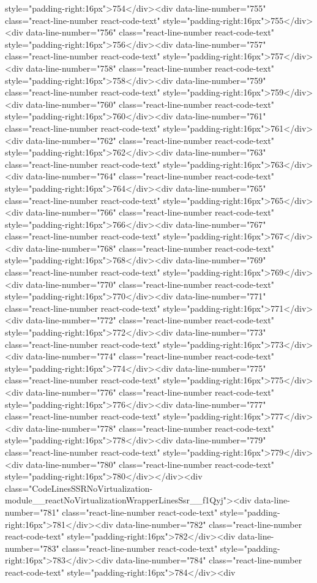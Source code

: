 {{{{{{{style="padding-right:16px">754</div><div data-line-number="755" class="react-line-number react-code-text" style="padding-right:16px">755</div><div data-line-number="756" class="react-line-number react-code-text" style="padding-right:16px">756</div><div data-line-number="757" class="react-line-number react-code-text" style="padding-right:16px">757</div><div data-line-number="758" class="react-line-number react-code-text" style="padding-right:16px">758</div><div data-line-number="759" class="react-line-number react-code-text" style="padding-right:16px">759</div><div data-line-number="760" class="react-line-number react-code-text" style="padding-right:16px">760</div><div data-line-number="761" class="react-line-number react-code-text" style="padding-right:16px">761</div><div data-line-number="762" class="react-line-number react-code-text" style="padding-right:16px">762</div><div data-line-number="763" class="react-line-number react-code-text" style="padding-right:16px">763</div><div data-line-number="764" class="react-line-number react-code-text" style="padding-right:16px">764</div><div data-line-number="765" class="react-line-number react-code-text" style="padding-right:16px">765</div><div data-line-number="766" class="react-line-number react-code-text" style="padding-right:16px">766</div><div data-line-number="767" class="react-line-number react-code-text" style="padding-right:16px">767</div><div data-line-number="768" class="react-line-number react-code-text" style="padding-right:16px">768</div><div data-line-number="769" class="react-line-number react-code-text" style="padding-right:16px">769</div><div data-line-number="770" class="react-line-number react-code-text" style="padding-right:16px">770</div><div data-line-number="771" class="react-line-number react-code-text" style="padding-right:16px">771</div><div data-line-number="772" class="react-line-number react-code-text" style="padding-right:16px">772</div><div data-line-number="773" class="react-line-number react-code-text" style="padding-right:16px">773</div><div data-line-number="774" class="react-line-number react-code-text" style="padding-right:16px">774</div><div data-line-number="775" class="react-line-number react-code-text" style="padding-right:16px">775</div><div data-line-number="776" class="react-line-number react-code-text" style="padding-right:16px">776</div><div data-line-number="777" class="react-line-number react-code-text" style="padding-right:16px">777</div><div data-line-number="778" class="react-line-number react-code-text" style="padding-right:16px">778</div><div data-line-number="779" class="react-line-number react-code-text" style="padding-right:16px">779</div><div data-line-number="780" class="react-line-number react-code-text" style="padding-right:16px">780</div></div><div class="CodeLinesSSRNoVirtualization-module__reactNoVirtualizationWrapperLinesSsr__f1Qyj"><div data-line-number="781" class="react-line-number react-code-text" style="padding-right:16px">781</div><div data-line-number="782" class="react-line-number react-code-text" style="padding-right:16px">782</div><div data-line-number="783" class="react-line-number react-code-text" style="padding-right:16px">783</div><div data-line-number="784" class="react-line-number react-code-text" style="padding-right:16px">784</div><div }}}}}}}
